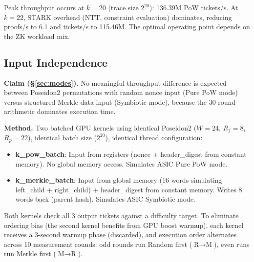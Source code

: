 \documentclass[11pt,a4paper]{article}
\begin{document}
Peak throughput occurs at $k = 20$ (trace size $2^{20}$): 136.39M PoW tickets/s. At $k = 22$, STARK overhead (NTT, constraint evaluation) dominates, reducing proofs/s to 6.1 and tickets/s to 115.46M. The optimal operating point depends on the ZK workload mix.

\subsection{Input Independence}
\label{sec:gpu-invariance}

\textbf{Claim (\S\ref{sec:modes}).} No meaningful throughput difference is expected between Poseidon2 permutations with random nonce input (Pure PoW mode) versus structured Merkle data input (Symbiotic mode), because the 30-round arithmetic dominates execution time.

\textbf{Method.} Two batched GPU kernels using identical Poseidon2 ($W=24$, $R_f=8$, $R_p=22$), identical batch size ($2^{20}$), identical thread configuration:
\begin{itemize}
\item \textbf{k\_pow\_batch}: Input from registers (nonce + header\_digest from constant memory). No global memory access. Simulates ASIC Pure PoW mode.
\item \textbf{k\_merkle\_batch}: Input from global memory (16 words simulating left\_child + right\_child) + header\_digest from constant memory. Writes 8 words back (parent hash). Simulates ASIC Symbiotic mode.
\end{itemize}
Both kernels check all 3 output tickets against a difficulty target.
To eliminate ordering bias (the second kernel benefits from GPU boost warmup), each kernel receives a 3-second warmup phase (discarded), and execution order alternates across 10 measurement rounds: odd rounds run Random first ($\text{R}{\to}\text{M}$), even runs run Merkle first ($\text{M}{\to}\text{R}$).
\end{document}
